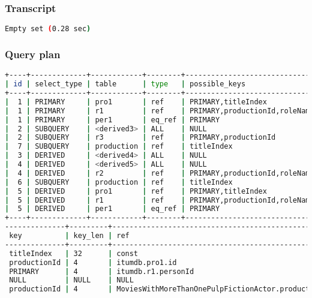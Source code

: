 \subsubsection{Transcript}
\begin{lstlisting}[language=bash]
Empty set (0.28 sec)
\end{lstlisting}

\subsubsection{Query plan}
\begin{lstlisting}[language=bash]
+----+-------------+------------+--------+------------------------------------+
| id | select_type | table      | type   | possible_keys                      |
+----+-------------+------------+--------+------------------------------------+
|  1 | PRIMARY     | pro1       | ref    | PRIMARY,titleIndex                 |
|  1 | PRIMARY     | r1         | ref    | PRIMARY,productionId,roleNameIndex |
|  1 | PRIMARY     | per1       | eq_ref | PRIMARY                            |
|  2 | SUBQUERY    | <derived3> | ALL    | NULL                               |
|  2 | SUBQUERY    | r3         | ref    | PRIMARY,productionId               |
|  7 | SUBQUERY    | production | ref    | titleIndex                         |
|  3 | DERIVED     | <derived4> | ALL    | NULL                               |
|  4 | DERIVED     | <derived5> | ALL    | NULL                               |
|  4 | DERIVED     | r2         | ref    | PRIMARY,productionId,roleNameIndex |
|  6 | SUBQUERY    | production | ref    | titleIndex                         |
|  5 | DERIVED     | pro1       | ref    | PRIMARY,titleIndex                 |
|  5 | DERIVED     | r1         | ref    | PRIMARY,productionId,roleNameIndex |
|  5 | DERIVED     | per1       | eq_ref | PRIMARY                            |
+----+-------------+------------+--------+------------------------------------+
--------------+---------+----------------------------------------------------+
 key          | key_len | ref                                                |
--------------+---------+----------------------------------------------------+
 titleIndex   | 32      | const                                              |
 productionId | 4       | itumdb.pro1.id                                     |
 PRIMARY      | 4       | itumdb.r1.personId                                 |
 NULL         | NULL    | NULL                                               |
 productionId | 4       | MoviesWithMoreThanOnePulpFictionActor.productionId |

\end{lstlisting}
